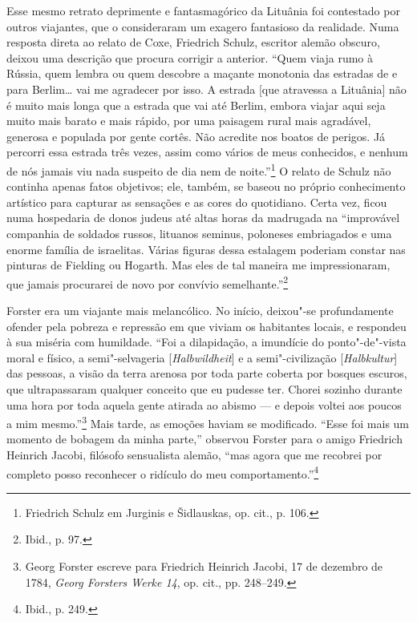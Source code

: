 Esse mesmo retrato deprimente e fantasmagórico da Lituânia foi
contestado por outros viajantes, que o consideraram um exagero
fantasioso da realidade. Numa resposta direta ao relato de Coxe,
Friedrich Schulz, escritor alemão obscuro, deixou uma descrição que
procura corrigir a anterior. ``Quem viaja rumo à Rússia, quem lembra ou
quem descobre a maçante monotonia das estradas de e para Berlim\ldots{}
vai me agradecer por isso. A estrada {[}que atravessa a Lituânia{]} não
é muito mais longa que a estrada que vai até Berlim, embora viajar aqui
seja muito mais barato e mais rápido, por uma paisagem rural mais
agradável, generosa e populada por gente cortês. Não acredite nos boatos
de perigos. Já percorri essa estrada três vezes, assim como vários de
meus conhecidos, e nenhum de nós jamais viu nada suspeito de dia nem de
noite.''\footnote{Friedrich Schulz em Jurginis e Šidlauskas, op. cit.,
  p. 106.} O relato de Schulz não continha apenas fatos objetivos; ele,
também, se baseou no próprio conhecimento artístico para capturar as
sensações e as cores do quotidiano. Certa vez, ficou numa hospedaria de
donos judeus até altas horas da madrugada na ``improvável companhia de
soldados russos, lituanos seminus, poloneses embriagados e uma enorme
família de israelitas. Várias figuras dessa estalagem poderiam constar
nas pinturas de Fielding ou Hogarth. Mas eles de tal maneira me
impressionaram, que jamais procurarei de novo por convívio
semelhante.''\footnote{Ibid., p. 97.}

Forster era um viajante mais melancólico. No início, deixou"-se
profundamente ofender pela pobreza e repressão em que viviam os
habitantes locais, e respondeu à sua miséria com humildade. ``Foi a
dilapidação, a imundície do ponto"-de"-vista moral e físico, a
semi"-selvageria {[}\emph{Halbwildheit}{]} e a semi"-civilização
{[}\emph{Halbkultur}{]} das pessoas, a visão da terra arenosa por toda
parte coberta por bosques escuros, que ultrapassaram qualquer conceito
que eu pudesse ter. Chorei sozinho durante uma hora por toda aquela
gente atirada ao abismo --- e depois voltei aos poucos a mim
mesmo.''\footnote{Georg Forster escreve para Friedrich Heinrich Jacobi,
  17 de dezembro de 1784, \emph{Georg Forsters Werke 14}, op. cit., pp.
  248--249.} Mais tarde, as emoções haviam se modificado. ``Esse foi mais
um momento de bobagem da minha parte,'' observou Forster para o amigo
Friedrich Heinrich Jacobi, filósofo sensualista alemão, ``mas agora que
me recobrei por completo posso reconhecer o ridículo do meu
comportamento.''\footnote{Ibid., p. 249.}

